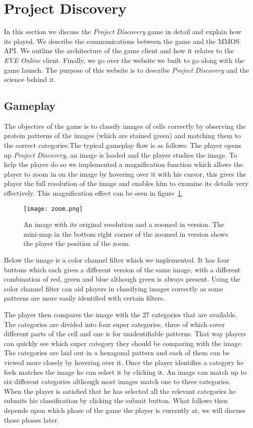 \section{Project Discovery}\label{sec:projectdiscovery}
In this section we discuss the \emph{Project Discovery} game in detail and explain how its played. We describe the communications between the game and the MMOS API. We outline the architecture of the game client and how it relates to the \emph{EVE Online} client. Finally, we go over the website we built to go along with the game launch. The purpose of this website is to describe \emph{Project Discovery} and the science behind it.

\subsection{Gameplay}
The objective of the game is to classify images of cells correctly by observing the protein patterns of the images (which are stained green) and matching them to the correct categories.The typical gameplay flow is as follows: The player opens up \emph{Project Discovery}, an image is loaded and the player studies the image. To help the player do so we implemented a magnification function which allows the player to zoom in on the image by hovering over it with his cursor, this gives the player the full resolution of the image and enables him to examine its details very effectively. This magnification effect can be seen in figure~\ref{fig:zoom}.

\begin{figure}[H]
\centering
\graphicspath{ {./graphics/} }
\centerline{\texttt{[image: zoom.png]}}
\caption{\label{fig:zoom}An image with its original resolution and a zoomed in version. The mini-map in the bottom right corner of the zoomed in version shows the player the position of the zoom.}
\end{figure}

Below the image is a color channel filter which we implemented. It has four buttons which each gives a different version of the same image, with a different combination of red, green and blue although green is always present. Using the color channel filter can aid players in classifying images correctly as some patterns are more easily identified with certain filters.

The player then compares the image with the 27 categories that are available. The categories are divided into four super categories, three of which cover different parts of the cell and one is for unidentifiable patterns. That way players can quickly see which super category they should be comparing with the image. The categories are laid out in a hexagonal pattern and each of them can be viewed more closely by hovering over it. Once the player identifies a category he feels matches the image he can select it by clicking it. An image can match up to six different categories although most images match one to three categories. When the player is satisfied that he has selected all the relevant categories he submits his classification by clicking the submit button. What follows then depends upon which phase of the game the player is currently at, we will discuss those phases later.

